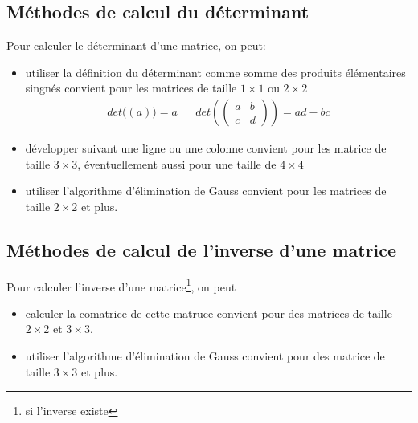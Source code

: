 %
\subsection{Méthodes de calcul du déterminant}
%
Pour calculer le déterminant d'une matrice, on peut:
\begin{itemize}
  \item utiliser la définition du déterminant comme somme des produits élémentaires singnés convient pour les matrices de taille $1 \times 1$ ou $2 \times 2$
    $$\begin{array}{lcr} det\big((a)\big) = a & & det\left(\begin{pmatrix} a & b \\ c & d \end{pmatrix}\right) = ad - bc \end{array}$$
  \item développer suivant une ligne ou une colonne convient pour les matrice de taille $3 \times 3$, éventuellement aussi pour une taille de $4 \times 4$
  \item utiliser l'algorithme d'élimination de Gauss convient pour les matrices de taille $2 \times 2$ et plus.
\end{itemize}

%
\subsection{Méthodes de calcul de l'inverse d'une matrice}
Pour calculer  l'inverse d'une matrice\footnote{si l'inverse existe}, on peut
\begin{itemize}
  \item calculer la comatrice de cette matruce convient pour des matrices de taille $2 \times 2$ et $3 \times 3$.
  \item utiliser l'algorithme d'élimination de Gauss convient pour des matrice de taille $3 \times 3$ et plus.
\end{itemize}

